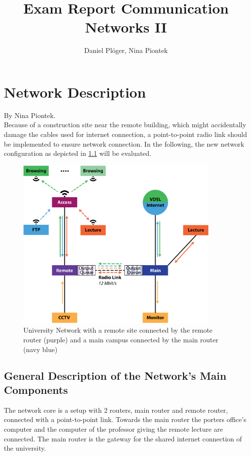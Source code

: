 \documentclass[a4paper,10pt]{book}\usepackage{graphicx}
\title{Exam Report Communication Networks II}
\author{Daniel Plöger, Nina Piontek}
\begin{document}
\maketitle
\tableofcontents



\chapter{Network Description}
By Nina Piontek.\\

Because of a construction site near the remote building, which might accidentally damage the cables 
used for internet connection,
a point-to-point radio link should be implemented to ensure network connection.
In the following, the new network configuration as depicted in \ref{fig:network} will be evaluated.
\begin{figure}[!ht]
  \begin{center}
    \includegraphics[width=0.9\textwidth]{graphics-03.eps}
    \caption{University Network with a remote site connected by the remote router (purple) and a main campus connected by the main router (navy blue)}
    \label{fig:network}
  \end{center}
\end{figure}

\section{General Description of the Network's Main Components}

The network core is a setup with 2 routers, main router and remote router, connected with a point-to-point link. 
Towards the main router the porters office's computer and the computer of the professor giving the remote lecture are connected.
The main router is the gateway for the shared internet connection of the university.
\end{document}
